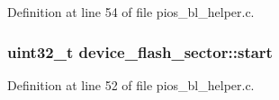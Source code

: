 \-Definition at line 54 of file pios\-\_\-bl\-\_\-helper.\-c.

\hypertarget{group___p_i_o_s___b_o_o_t_l_o_a_d_e_r_ga8efbeb4ac8f39002737374387a063360}{
\subsubsection[{start}]{\setlength{\rightskip}{0pt plus 5cm}uint32\-\_\-t {\bf device\-\_\-flash\-\_\-sector\-::start}}}\label{group___p_i_o_s___b_o_o_t_l_o_a_d_e_r_ga8efbeb4ac8f39002737374387a063360}


\-Definition at line 52 of file pios\-\_\-bl\-\_\-helper.\-c.

